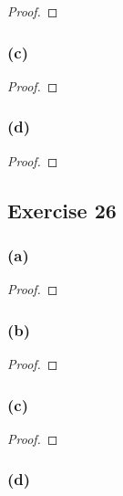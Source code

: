 \documentclass[14pt]{extarticle}
\begin{document}
\begin{proof}

\end{proof}

\subsubsection{(c)}

\begin{proof}

\end{proof}

\subsubsection{(d)}

\begin{proof}

\end{proof}

\subsection{Exercise 26}

\subsubsection{(a)}

\begin{proof}

\end{proof}

\subsubsection{(b)}

\begin{proof}

\end{proof}

\subsubsection{(c)}

\begin{proof}

\end{proof}

\subsubsection{(d)}
\end{document}
